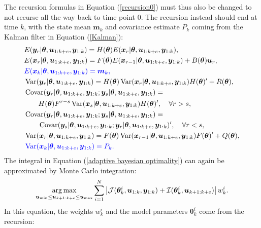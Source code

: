 The recursion formulas in Equation (\ref{recursion0}) must thus also be changed to not recurse all the way back to time point $0$. The recursion instead should end at time $k$, with the state mean $\bm m_k$ and covariance estimate $P_k$ coming from the Kalman filter in Equation (\ref{Kalman}):
\begin{equation}
\begin{aligned}
&E(\bm y_r |\bm \theta, \bm u_{1:k+e}, \bm y_{1:k})
= H(\bm \theta)E(\bm x_r |\bm \theta, \bm u_{1:k+e}, \bm y_{1:k}),\\
&E(\bm x_r |\bm \theta, \bm u_{1:k+e}, \bm y_{1:k})
= F(\bm \theta)E(\bm x_{r-1} |\bm \theta, \bm u_{1:k+e}, \bm y_{1:k})
+ B(\bm \theta)\bm u_r,\\
&\color{blue}E(\bm x_k|\bm \theta, \bm u_{1:k+e}, \bm y_{1:k})
= \color{blue} \bm m_k,\\
&\operatorname{\mathrm{Var}} (\bm y_r |\bm \theta, \bm u_{1:k+e}, \bm y_{1:k})
= H(\bm \theta)\operatorname{\mathrm{Var}} (\bm x_r |\bm \theta, \bm u_{1:k+e}, \bm y_{1:k})H(\bm \theta)'
+R(\bm \theta),\\
&\operatorname{\mathrm{Covar}} (\bm y_r |\bm \theta, \bm u_{1:k+e}, \bm y_{1:k};\bm y_s |\bm \theta, \bm u_{1:k+e}, \bm y_{1:k}) =\\
& \qquad  H(\bm \theta)F^{r-s}\operatorname{\mathrm{Var}} (\bm x_s |\bm \theta, \bm u_{1:k+e}, \bm y_{1:k})H(\bm \theta)',
\quad \forall r>s,\\
&\operatorname{\mathrm{Covar}} (\bm y_r |\bm \theta, \bm u_{1:k+e}, \bm y_{1:k};\bm y_s |\bm \theta, \bm u_{1:k+e}, \bm y_{1:k})=\\
&\qquad \operatorname{\mathrm{Covar}} (\bm y_s |\bm \theta, \bm u_{1:k+e}, \bm y_{1:k};\bm y_r |\bm \theta, \bm u_{1:k+e}, \bm y_{1:k})' ,
\quad \forall r<s, \\
&\operatorname{\mathrm{Var}} (\bm x_r |\bm \theta, \bm u_{1:k+e}, \bm y_{1:k})
= F(\bm \theta)\operatorname{\mathrm{Var}} (\bm x_{r-1} |\bm \theta, \bm u_{1:k+e}, \bm y_{1:k})F(\bm \theta)'
+ Q(\bm \theta),\\
&\color{blue} \operatorname{\mathrm{Var}} (\bm x_k |\bm \theta, \bm u_{1:k+e}, \bm y_{1:k})
= \color{blue} P_k.
\end{aligned}
\label{recursioni}
\end{equation}
The integral in Equation (\ref{adaptive bayesian optimality}) can again be approximated by Monte Carlo integration:
\begin{equation}
\operatorname*{arg\,max}_{\bm u_\text{min} \leq \bm u_{k+1:k+e} \leq \bm u_\text{max}}
\sum_{i=1}^N
\left |\mathcal{J}(\bm \theta^i_k,\bm u_{1:k}, \bm y_{1:k}) + \mathcal{I}(\bm \theta^i_k,\bm u_{k+1:k+e}) \right |w_k^i.
\label{final criterion}
\end{equation}
In this equation, the weights $w_k^i$ and the model parameters $\bm \theta_k^i$ come from the recursion:

